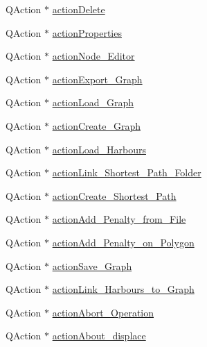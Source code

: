 \begin{DoxyCompactItemize}
\item 
Q\+Action $\ast$ \mbox{\hyperlink{class_ui___main_window_afb59de5123ae6409ff52703112e751f2}{action\+Delete}}
\item 
Q\+Action $\ast$ \mbox{\hyperlink{class_ui___main_window_adc69c1d59f56327ab1e42fd985f66b49}{action\+Properties}}
\item 
Q\+Action $\ast$ \mbox{\hyperlink{class_ui___main_window_a59f031d6096fd948ac71b1c9e138a42c}{action\+Node\+\_\+\+Editor}}
\item 
Q\+Action $\ast$ \mbox{\hyperlink{class_ui___main_window_aae83dd2e2e18eaaaa72920a8e9acf335}{action\+Export\+\_\+\+Graph}}
\item 
Q\+Action $\ast$ \mbox{\hyperlink{class_ui___main_window_a9ef004e4c0de34b1095737c8329604d1}{action\+Load\+\_\+\+Graph}}
\item 
Q\+Action $\ast$ \mbox{\hyperlink{class_ui___main_window_adf791c344b13223e1af924e2df6f1047}{action\+Create\+\_\+\+Graph}}
\item 
Q\+Action $\ast$ \mbox{\hyperlink{class_ui___main_window_a9f50f54410a0ac3273f3c3ce9934ed56}{action\+Load\+\_\+\+Harbours}}
\item 
Q\+Action $\ast$ \mbox{\hyperlink{class_ui___main_window_ad9b26ac6479878ed986088151dd6c329}{action\+Link\+\_\+\+Shortest\+\_\+\+Path\+\_\+\+Folder}}
\item 
Q\+Action $\ast$ \mbox{\hyperlink{class_ui___main_window_a1739eb100c00edc81b12e1f6d08525c2}{action\+Create\+\_\+\+Shortest\+\_\+\+Path}}
\item 
Q\+Action $\ast$ \mbox{\hyperlink{class_ui___main_window_a5dd5ff1392b0bb93de1e59e4a8f705c3}{action\+Add\+\_\+\+Penalty\+\_\+from\+\_\+\+File}}
\item 
Q\+Action $\ast$ \mbox{\hyperlink{class_ui___main_window_a68ed42509e4d9a7993ba4da6dce52072}{action\+Add\+\_\+\+Penalty\+\_\+on\+\_\+\+Polygon}}
\item 
Q\+Action $\ast$ \mbox{\hyperlink{class_ui___main_window_a37d2b4f0bc4bcf89400b9e0868d835f5}{action\+Save\+\_\+\+Graph}}
\item 
Q\+Action $\ast$ \mbox{\hyperlink{class_ui___main_window_ab0b65065f766786b4373b8e1ce4af245}{action\+Link\+\_\+\+Harbours\+\_\+to\+\_\+\+Graph}}
\item 
Q\+Action $\ast$ \mbox{\hyperlink{class_ui___main_window_af8158c32a84ccaff0a55be82c5c40cfa}{action\+Abort\+\_\+\+Operation}}
\item 
Q\+Action $\ast$ \mbox{\hyperlink{class_ui___main_window_afff5f5f0680b93cda3fafaaa1dcd0372}{action\+About\+\_\+displace}}

\end{DoxyCompactItemize}
